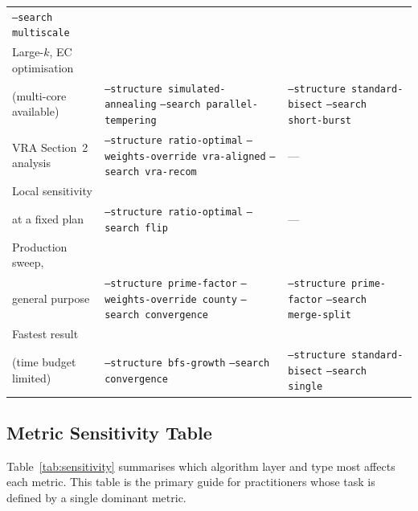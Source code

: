 \begin{table}[ht]
\begin{tabular}{@{}p{4.5cm}p{4.2cm}p{4.2cm}@{}}
    \texttt{--search multiscale} \\[6pt]
Large-$k$, EC optimisation\\(multi-core available)
  & \texttt{--structure simulated-annealing}\newline
    \texttt{--search parallel-tempering}
  & \texttt{--structure standard-bisect}\newline
    \texttt{--search short-burst} \\[6pt]
VRA Section~2 analysis
  & \texttt{--structure ratio-optimal}\newline
    \texttt{--weights-override vra-aligned}\newline
    \texttt{--search vra-recom}
  & --- \\[6pt]
Local sensitivity\\at a fixed plan
  & \texttt{--structure ratio-optimal}\newline
    \texttt{--search flip}
  & --- \\[6pt]
Production sweep,\\general purpose
  & \texttt{--structure prime-factor}\newline
    \texttt{--weights-override county}\newline
    \texttt{--search convergence}
  & \texttt{--structure prime-factor}\newline
    \texttt{--search merge-split} \\[6pt]
Fastest result\\(time budget limited)
  & \texttt{--structure bfs-growth}\newline
    \texttt{--search convergence}
  & \texttt{--structure standard-bisect}\newline
    \texttt{--search single} \\
\bottomrule
\end{tabular}
\end{table}

\subsection{Metric Sensitivity Table}

Table~\ref{tab:sensitivity} summarises which algorithm layer and type most
affects each metric.
This table is the primary guide for practitioners whose task is defined by
a single dominant metric.

